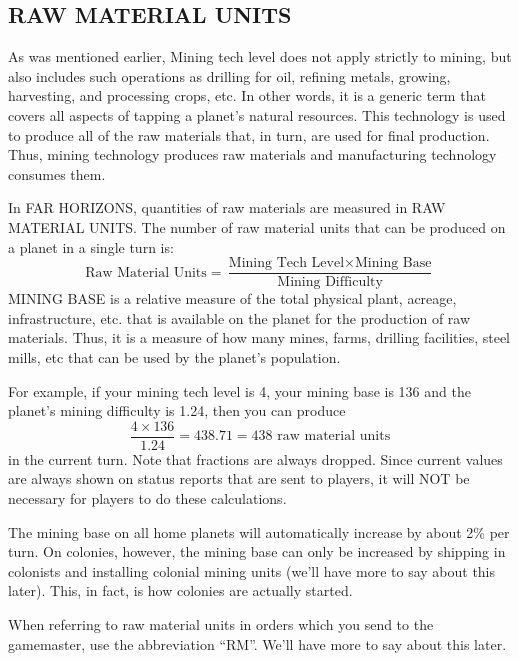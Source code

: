 \documentclass[10pt,titlepage]{article}
\begin{document}
\subsection{RAW MATERIAL UNITS}
\label{sec:rawmaterialunits}


As was mentioned earlier, Mining tech level does not apply strictly to mining,
but also includes such operations as drilling for oil, refining metals,
growing, harvesting, and processing crops, etc.  In other words, it is a
generic term that covers all aspects of tapping a planet's natural resources.
This technology is used to produce all of the raw materials that, in turn, are
used for final production.  Thus, mining technology produces raw materials and
manufacturing technology consumes them.

In FAR HORIZONS, quantities of raw materials are measured in RAW MATERIAL
UNITS.  The number of raw material units that can be produced on a planet in a
single turn is:
\begin{equation*}
	\textrm{Raw Material Units}  = \dfrac{\textrm{Mining Tech Level}  \times  \textrm{Mining Base}}{\textrm{Mining Difficulty}}
\end{equation*}
MINING BASE is a relative measure of the total physical plant, acreage,
infrastructure, etc. that is available on the planet for the production of
raw materials.  Thus, it is a measure of how many mines, farms, drilling
facilities, steel mills, etc that can be used by the planet's population.

For example, if your mining tech level is 4, your mining base is 136 and the
planet's mining difficulty is 1.24, then you can produce
\begin{equation*}
\dfrac{4  \times  136}{1.24} = 438.71 = 438 \textrm{ raw material units}
\end{equation*}
in the current turn.  Note that fractions are always dropped.  Since current
values are always shown on status reports that are sent to players, it will
NOT be necessary for players to do these calculations.

The mining base on all home planets will automatically increase by about 2\% per
turn.  On colonies, however, the mining base can only be increased by shipping
in colonists and installing colonial mining units (we'll have more to say about
this later).  This, in fact, is how colonies are actually started.

When referring to raw material units in orders which you send to the
gamemaster, use the abbreviation ``RM''.  We'll have more to say about this
later.
\end{document}
